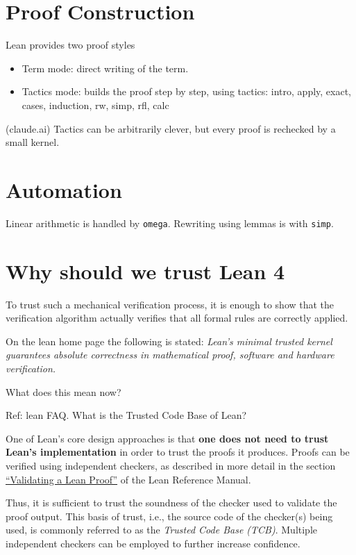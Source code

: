 \section{Proof Construction}
Lean provides two proof styles
\begin{itemize}
  \item Term mode: direct writing of the term.
  \item Tactics mode: builds the proof step by step, using tactics:
  intro, apply, exact, cases, induction, rw, simp, rfl, calc
\end{itemize}


(claude.ai) Tactics can be arbitrarily clever, but every proof is
rechecked by a small kernel. 

\section{Automation}
Linear arithmetic is handled by \texttt{omega}. Rewriting using 
lemmas is with \texttt{simp}. 



\section{Why should we trust Lean 4}
To trust such a mechanical verification process, it is enough to show that the verification algorithm actually 
verifies that all formal rules are correctly applied. \cite[Chapter~1.2]{coq_book}

On the lean home page \cite{web:lean_homepage} the following is stated: \textit{ Lean's minimal trusted kernel guarantees absolute correctness in mathematical proof, software and hardware verification.}

What does this mean now?

Ref: lean FAQ.
What is the Trusted Code Base of Lean?

One of Lean's core design approaches is that \textbf{one does not 
need to trust Lean's implementation} in order to trust the proofs 
it produces. Proofs can be verified using independent checkers, 
as described in more detail in the section 
\href{https://lean-lang.org/doc/reference/latest/find/?domain=Verso.Genre.Manual.section\&name=validating-proofs}
{``Validating a Lean Proof''} of the Lean Reference Manual.

Thus, it is sufficient to trust the soundness of the checker used 
to validate the proof output. This basis of trust, i.e., the 
source code of the checker(s) being used, is commonly referred 
to as the \textit{Trusted Code Base (TCB)}. Multiple independent 
checkers can be employed to further increase confidence.

